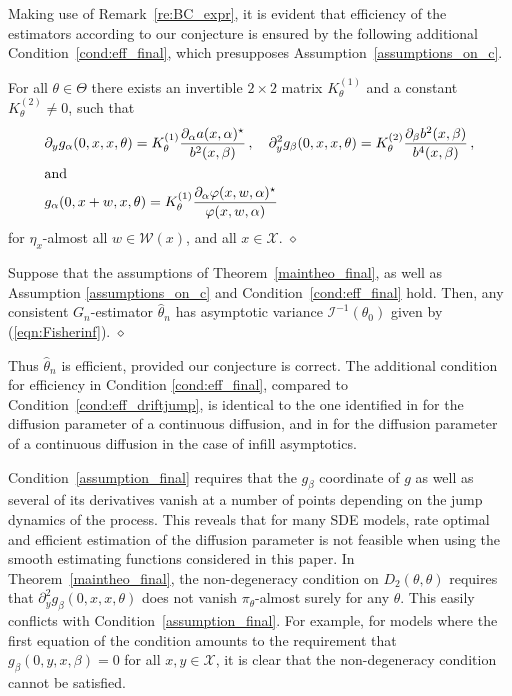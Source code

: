 \documentclass[11pt,a4paper]{article}
\newcommand{\thetan}{{\theta_0}}
\newcommand{\ii}{{\mathcal{I}}}
\newcommand{\xx}{{\mathcal{X}}}
\newcommand{\ww}{{\mathcal{W}}}
\newcommand{\dqed}{{\leavevmode \unskip \penalty9999 \hbox{} \nobreak \hfill \quad \hbox{$\diamond$}}}
\numberwithin{equation}{section}
\numberwithin{theorem}{section}
\begin{document}
Making use of Remark~\ref{re:BC_expr}, it is evident that efficiency of the estimators according to our conjecture is ensured by the following additional Condition~\ref{cond:eff_final}, which presupposes Assumption~\ref{assumptions_on_c}.
%
\begin{condition}
For all $\theta \in \Theta$ there exists an invertible $2\times 2$ matrix $K_\theta^{(1)}$ and a constant $K_\theta^{(2)} \neq 0$, such that
\begin{align*}
&\partial_y g_\alpha (0,x,x,\theta) = K_\theta^{(1)} \frac{\partial_\alpha a(x,\alpha)^\star}{b^2(x,\beta)} \,,\quad \partial^2_y g_\beta(0,x,x,
                 \theta) = K_\theta^{(2)} \frac{\partial_\beta b^2 (x, \beta)}{b^4(x, \beta)}\,,\\
  \intertext{and}
&g_\alpha(0,x+w,x,\theta) = K_\theta^{(1)} \frac{\partial_\alpha \varphi(x,w,\alpha)^\star}{\varphi(x,w,\alpha)}
\end{align*}
for $\eta_x$-almost all $w\in \ww(x)$, and all $x\in\xx$.\dqed
\label{cond:eff_final}
\end{condition} 
%
\begin{corollary}
Suppose that the assumptions of Theorem~\ref{maintheo_final}, as well as Assumption
\ref{assumptions_on_c} and Condition~\ref{cond:eff_final} hold. Then, any consistent $G_n$-estimator $\hat{\theta}_n$ has asymptotic variance $\ii^{-1}(\thetan)$ given by (\ref{eqn:Fisherinf}). \dqed
\label{cor:final}
\end{corollary}
%
Thus $\hat{\theta}_n$ is efficient, provided our conjecture is correct.
The additional condition for efficiency in Condition \ref{cond:eff_final}, compared to Condition~\ref{cond:eff_driftjump}, is identical to the one identified in \cite{efficient} for the diffusion parameter of a continuous diffusion, and in \cite{jakobsen2017} for the diffusion parameter of a continuous diffusion in the case of infill asymptotics. \medskip

Condition~\ref{assumption_final} requires that the $g_\beta$ coordinate of $g$ as well as several of its derivatives vanish at a number of points depending on the jump dynamics of the process. This reveals that for many SDE models, rate optimal and efficient estimation of the diffusion parameter is not feasible when using the smooth estimating functions considered in this paper. In Theorem~\ref{maintheo_final}, the non-degeneracy condition on $D_2(\theta, \theta)$ requires that $\partial^2_y g_\beta(0,x,x, \theta)$ does not vanish $\pi_\theta$-almost surely for any $\theta$. This easily conflicts with Condition~\ref{assumption_final}. For example, for models where the first equation of the condition amounts to the requirement that $g_\beta(0,y,x, \beta)=0$ for all $x,y \in \xx$, it is clear that the non-degeneracy condition cannot be satisfied. \medskip
\end{document}
